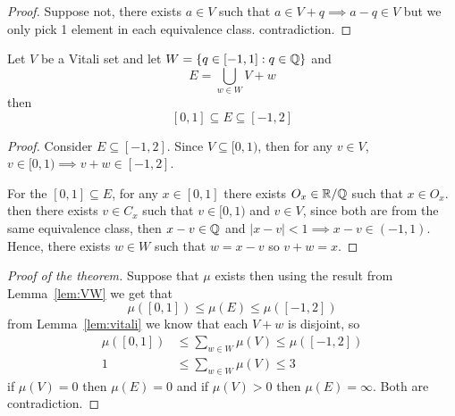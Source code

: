 \begin{proof}
  Suppose not, there exists $a \in V$ such that $a \in V + q\implies a-q \in V$ 
  but we only pick 1 element in each equivalence class. contradiction.  
\end{proof}

\begin{lemma}\label{lem:VW}
  Let $V$ be a Vitali set and let $W = \{q \in [-1, 1] : q \in \mathbb Q\}$ and 
  \[ E = \bigcup_{w \in W}V + w\]
   then 
  \[[0, 1] \subseteq E \subseteq [-1, 2]\]
\end{lemma}

\begin{proof}
  Consider $E \subseteq [-1, 2]$. Since $V \subseteq [0, 1)$, then
  for any $v \in V$, $v \in [0, 1) \implies v + w \in [-1, 2]$.

  For the $[0, 1] \subseteq E$,
  for any $x \in [0, 1]$ there exists $O_x \in \mathbb R/\mathbb Q$ such that $x \in O_x$.
  then there exists $v \in C_x$ such that $v \in [0, 1)$ and $v \in V$, since both
  are from the same equivalence class, then $x - v \in \mathbb Q$ and $|x - v| < 1 \implies x - v \in (-1, 1)$.
  Hence, there exists $w \in W$ such that $w = x-v$ so $v+w = x$.
\end{proof}


\begin{proof}[Proof of the theorem]
  Suppose that $\mu$ exists then using the result from Lemma~\ref{lem:VW} we get that  
  \[ \mu([0, 1]) \leq \mu\left(E\right) \leq \mu([-1, 2])\]
  from Lemma~\ref{lem:vitali} we know that each $V+w$ is disjoint, so
  \begin{align*}
    \mu([0, 1]) &\leq \sum_{w \in W}\mu(V) \leq \mu([-1, 2])\\
    1 &\leq \sum_{w \in W}\mu(V) \leq 3
  \end{align*}
  if $\mu(V) = 0$ then $\mu(E) = 0$ and if $\mu(V) > 0$ then $\mu(E) = \infty$. Both are contradiction. 
\end{proof}

